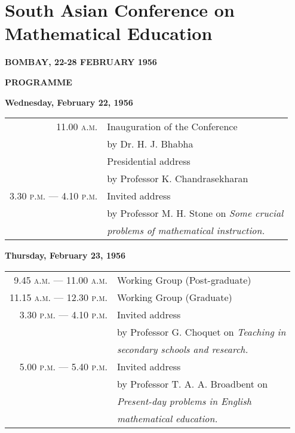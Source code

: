\chapter{South Asian Conference on Mathematical Education}

\begin{center}
{\bf BOMBAY, 22-28 FEBRUARY 1956}
\medskip

{\large\bf PROGRAMME}
\end{center}

\bigskip

\setcounter{pageoriginal}{16}
\begin{center}
{\bf Wednesday, February 22, 1956}\pageoriginale
\end{center}

\begin{longtable}[l]{r@{\;\;}l}
11.00 \textsc{a.m.} & Inauguration of the Conference\\[3pt]
                    & by Dr. H. J. Bhabha\\[8pt]
                    & Presidential address\\[3pt]
                    & by Professor K. Chandrasekharan\\[8pt]
3.30 \textsc{p.m.} --- 4.10 \textsc{p.m.} & Invited address\\[3pt]
                    & by Professor M. H. Stone on {\em Some crucial}\\
                    & {\em problems of mathematical instruction.}
\end{longtable}

\begin{center}
{\bf Thursday, February 23, 1956}
\end{center}

\begin{longtable}[l]{r@{\;\;}l}
9.45 \textsc{a.m.} --- 11.00 \textsc{a.m.} & Working Group (Post-graduate)\\[6pt]
11.15 \textsc{a.m.} --- 12.30 \textsc{p.m.} & Working Group (Graduate)\\[6pt]
3.30 \textsc{p.m.} --- 4.10 \textsc{p.m.} & Invited address\\[3pt]
                     & by Professor G. Choquet on {\em Teaching in}\\
                     & {\em secondary schools and research.}\\[8pt]
5.00 \textsc{p.m.} --- 5.40 \textsc{p.m.} & Invited address\\[3pt]
                  & by Professor T. A. A. Broadbent on\\
                  & {\em Present-day problems in English}\\
                  & {\em mathematical education.}
\end{longtable}

